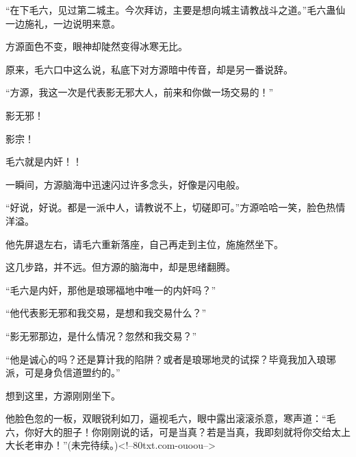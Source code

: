 \begin{this_body}
“在下毛六，见过第二城主。今次拜访，主要是想向城主请教战斗之道。”毛六蛊仙一边施礼，一边说明来意。

方源面色不变，眼神却陡然变得冰寒无比。

原来，毛六口中这么说，私底下对方源暗中传音，却是另一番说辞。

“方源，我这一次是代表影无邪大人，前来和你做一场交易的！”

影无邪！

影宗！

毛六就是内奸！！

一瞬间，方源脑海中迅速闪过许多念头，好像是闪电般。

“好说，好说。都是一派中人，请教说不上，切磋即可。”方源哈哈一笑，脸色热情洋溢。

他先屏退左右，请毛六重新落座，自己再走到主位，施施然坐下。

这几步路，并不远。但方源的脑海中，却是思绪翻腾。

“毛六是内奸，那他是琅琊福地中唯一的内奸吗？”

“他代表影无邪和我交易，是想和我交易什么？”

“影无邪那边，是什么情况？忽然和我交易？”

“他是诚心的吗？还是算计我的陷阱？或者是琅琊地灵的试探？毕竟我加入琅琊派，可是身负信道盟约的。”

想到这里，方源刚刚坐下。

他脸色忽的一板，双眼锐利如刀，逼视毛六，眼中露出滚滚杀意，寒声道：“毛六，你好大的胆子！你刚刚说的话，可是当真？若是当真，我即刻就将你交给太上大长老审办！”(未完待续。)<!--80txt.com-ouoou-->

\end{this_body}

